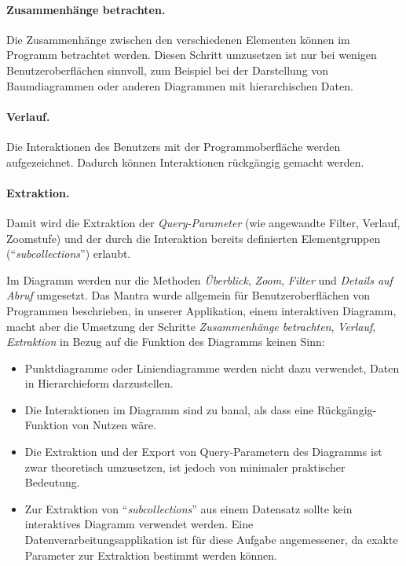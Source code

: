 \paragraph{Zusammenhänge betrachten.} Die Zusammenhänge zwischen den verschiedenen Elementen können im Programm betrachtet werden. Diesen Schritt umzusetzen ist nur bei wenigen Benutzeroberflächen sinnvoll, zum Beispiel bei der Darstellung von Baumdiagrammen oder anderen Diagrammen mit hierarchischen Daten.

\paragraph{Verlauf.} Die Interaktionen des Benutzers mit der Programmoberfläche werden aufgezeichnet. Dadurch können Interaktionen rückgängig gemacht werden.

\paragraph{Extraktion.} Damit wird die Extraktion der \textit{Query-Parameter} (wie angewandte Filter, Verlauf, Zoomstufe) und der durch die Interaktion bereits definierten Elementgruppen ("`\textit{subcollections}"') erlaubt.

\vspace{\baselineskip}

Im Diagramm werden nur die Methoden \textit{Überblick}, \textit{Zoom}, \textit{Filter} und \textit{Details auf Abruf} umgesetzt. Das Mantra wurde allgemein für Benutzeroberflächen von Programmen beschrieben, in unserer Applikation, einem interaktiven Diagramm, macht aber die Umsetzung der Schritte \textit{Zusammenhänge betrachten}, \textit{Verlauf}, \textit{Extraktion} in Bezug auf die Funktion des Diagramms keinen Sinn:

\begin{itemize}
	\item Punktdiagramme oder Liniendiagramme werden nicht dazu verwendet, Daten in Hierarchieform darzustellen.
	\item Die Interaktionen im Diagramm sind zu banal, als dass eine Rückgängig-Funktion von Nutzen wäre.
	\item Die Extraktion und der Export von Query-Parametern des Diagramms ist zwar theoretisch umzusetzen, ist jedoch von minimaler praktischer Bedeutung.
	\item Zur Extraktion von "`\textit{subcollections}"' aus einem Datensatz sollte kein interaktives Diagramm verwendet werden. Eine Datenverarbeitungsapplikation ist für diese Aufgabe angemessener, da exakte Parameter zur Extraktion bestimmt werden können.
\end{itemize}